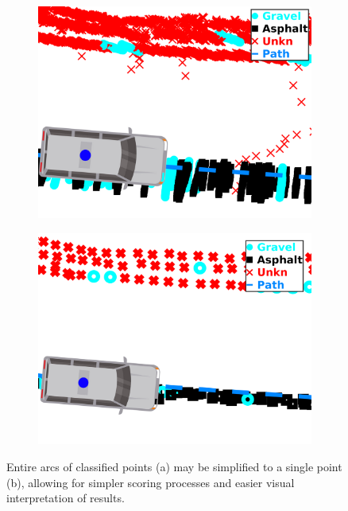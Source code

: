 \documentclass[numbered,pdftex]{ohio-etd}
\begin{document}
{{		\begin{figure}[H]
			\centering
			\begin{subfigure}{0.45\textwidth}
				\centering
				\includegraphics[width=1.0\linewidth]{Defense_Images/all_points_example_withvan}
				\caption[]{}
				\label{fig:all_points_example_withvan}
			\end{subfigure}
			\begin{subfigure}{0.45\textwidth}
				\centering
				\includegraphics[width=1.0\linewidth]{Defense_Images/avg_points_example_withvan}
				\caption[]{}
				\label{fig:avg_points_example_withvan}
			\end{subfigure}
			\caption[Average Arc Coordinate Cloud Creation]{Entire arcs of classified points (a) may be simplified to a single point (b), allowing for simpler scoring processes and easier visual interpretation of results. }
			\label{fig:all_to_avg}
		\end{figure}
		
}}
\end{document}

